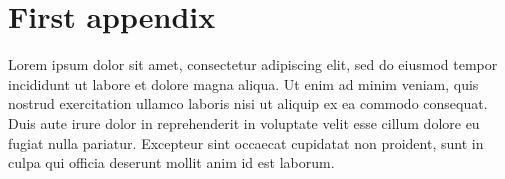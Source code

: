 \documentclass[
 reprint,
 unsortedaddress,
 preprintnumbers,
 nobibnotes,
 nofootinbib,
 longbibliography,
 amsmath,amssymb,
 aps,pra,
 onecolumn
]{revtex4-2}
\begin{document}
\appendix


\section{First appendix}
\label{app:lorem_appendix}

Lorem ipsum dolor sit amet, consectetur adipiscing elit, sed do eiusmod tempor incididunt ut labore et dolore magna aliqua. Ut enim ad minim veniam, quis nostrud exercitation ullamco laboris nisi ut aliquip ex ea commodo consequat. Duis aute irure dolor in reprehenderit in voluptate velit esse cillum dolore eu fugiat nulla pariatur. Excepteur sint occaecat cupidatat non proident, sunt in culpa qui officia deserunt mollit anim id est laborum.
\end{document}
